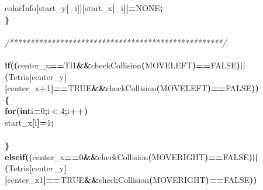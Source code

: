 \documentclass[a4paper, 10pt]{article}
\newcommand\SPC{\hspace*{0.6em}}
\newcommand\HYP{\mbox{\char 45}}
\newcommand{\CppAComment}[1]{\textit{\textcolor[rgb]{0.2,0.6,1}{#1}}}
\newcommand{\CppAIdentifier}[1]{#1}
\newcommand{\CppANumber}[1]{\textcolor[rgb]{0.5,0,0.5}{#1}}
\newcommand{\CppAReservedWord}[1]{\textbf{#1}}
\newcommand{\CppASpace}[1]{\colorbox[rgb]{1,1,1}{#1}}
\newcommand{\CppASymbol}[1]{\textbf{\textcolor[rgb]{1,0,0}{#1}}}
\begin{document}
\begin{ttfamily}
\CppASpace{\SPC \SPC \SPC \SPC \SPC }\CppAIdentifier{colorInfo}\CppASymbol{[}\CppAIdentifier{start\_y}\CppASymbol{[}\CppAIdentifier{\_i}\CppASymbol{]}\CppASymbol{]}\CppASymbol{[}\CppAIdentifier{start\_x}\CppASymbol{[}\CppAIdentifier{\_i}\CppASymbol{]}\CppASymbol{]}\CppASymbol{=}\CppAIdentifier{NONE}\CppASymbol{;}\\
\CppASpace{\SPC \SPC \SPC \SPC }\CppASymbol{\}}\\
\\
\CppASpace{\SPC \SPC \SPC \SPC }\CppAComment{/***************************************************/}\\
\\
\CppASpace{\SPC \SPC \SPC \SPC }\CppAReservedWord{if}\CppASymbol{(}\CppASymbol{(}\CppAIdentifier{center\_x}\CppASymbol{==}\CppAIdentifier{Tl}\CppASymbol{\HYP }\CppANumber{1}\CppASpace{\SPC }\CppASymbol{\&\&}\CppASpace{\SPC }\CppAIdentifier{checkCollision}\CppASymbol{(}\CppAIdentifier{MOVELEFT}\CppASymbol{)}\CppASymbol{==}\CppAIdentifier{FALSE}\CppASymbol{)}\CppASpace{\SPC }\CppASymbol{||}\CppASpace{\SPC }\CppASymbol{(}\CppAIdentifier{Tetris}\CppASymbol{[}\CppAIdentifier{center\_y}\CppASymbol{]}\CppASymbol{[}\CppAIdentifier{center\_x}\CppASymbol{+}\CppANumber{1}\CppASymbol{]}\CppASymbol{==}\CppAIdentifier{TRUE}\CppASymbol{\&\&}\CppAIdentifier{checkCollision}\CppASymbol{(}\CppAIdentifier{MOVELEFT}\CppASymbol{)}\CppASymbol{==}\CppAIdentifier{FALSE}\CppASymbol{)}\CppASymbol{)}\\
\CppASpace{\SPC \SPC \SPC \SPC }\CppASymbol{\{}\\
\CppASpace{\SPC \SPC \SPC \SPC \SPC }\CppAReservedWord{for}\CppASymbol{(}\CppAReservedWord{int}\CppASpace{\SPC }\CppAIdentifier{i}\CppASymbol{=}\CppANumber{0}\CppASymbol{;}\CppAIdentifier{i}\CppASymbol{$<$}\CppANumber{4}\CppASymbol{;}\CppAIdentifier{i}\CppASymbol{++}\CppASymbol{)}\\
\CppASpace{\SPC \SPC \SPC \SPC \SPC \SPC }\CppAIdentifier{start\_x}\CppASymbol{[}\CppAIdentifier{i}\CppASymbol{]}\CppASymbol{\HYP =}\CppANumber{1}\CppASymbol{;}\\
\\
\CppASpace{\SPC \SPC \SPC \SPC }\CppASymbol{\}}\\
\CppASpace{\SPC \SPC \SPC \SPC }\CppAReservedWord{else}\CppASpace{\SPC }\CppAReservedWord{if}\CppASymbol{(}\CppASymbol{(}\CppAIdentifier{center\_x}\CppASymbol{==}\CppANumber{0}\CppASpace{\SPC }\CppASymbol{\&\&}\CppASpace{\SPC }\CppAIdentifier{checkCollision}\CppASymbol{(}\CppAIdentifier{MOVERIGHT}\CppASymbol{)}\CppASymbol{==}\CppAIdentifier{FALSE}\CppASymbol{)}\CppASpace{\SPC }\CppASymbol{||}\CppASpace{\SPC }\CppASymbol{(}\CppAIdentifier{Tetris}\CppASymbol{[}\CppAIdentifier{center\_y}\CppASymbol{]}\CppASymbol{[}\CppAIdentifier{center\_x}\CppASymbol{\HYP }\CppANumber{1}\CppASymbol{]}\CppASymbol{==}\CppAIdentifier{TRUE}\CppASymbol{\&\&}\CppAIdentifier{checkCollision}\CppASymbol{(}\CppAIdentifier{MOVERIGHT}\CppASymbol{)}\CppASymbol{==}\CppAIdentifier{FALSE}\CppASymbol{)}\CppASymbol{)}\\

\end{ttfamily}
\end{document}
